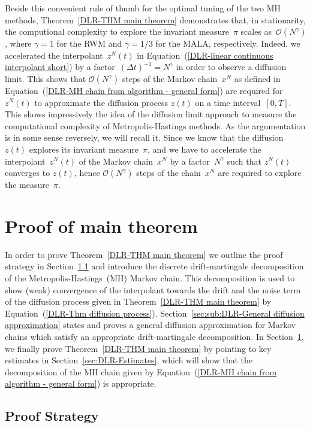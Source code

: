 Beside this convenient rule of thumb for the optimal tuning of the two MH methods, Theorem~\ref{DLR-THM main theorem} demonstrates that, in stationarity, the computional complexity to explore the invariant measure~$\pi$ scales as~$\mathcal{O}(N^{\gamma})$, where $\gamma=1$ for the RWM and $\gamma=1/3$ for the MALA, respectively. Indeed, we accelerated the interpolant~$z^N(t)$ in Equation~(\ref{DLR-linear continuous interpolant short}) by a factor~$(\Delta t)^{-1} = N^{\gamma}$ in order to observe a diffusion limit. This shows that $\mathcal{O}(N^{\gamma})$ steps of the Markov chain~$x^N$ as defined in Equation~(\ref{DLR-MH chain from algorithm - general form}) are required for $z^N(t)$ to approximate the diffusion process $z(t)$ on a time interval~$[0,T]$. This shows impressively the idea of the diffusion limit approach to measure the computational complexity of Metropolis-Hastings methods. As the argumentation is in some sense reversely, we will recall it. Since we know that the diffusion~$z(t)$ explores its invariant measure~$\pi$, and we have to accelerate the interpolant~$z^N(t)$ of the Markov chain~$x^N$ by a factor~$N^{\gamma}$ such that $z^N(t)$ converges to $z(t)$, hence $\mathcal{O}(N^{\gamma})$ steps of the chain~$x^N$ are required to explore the measure~$\pi$.


\section{Proof of main theorem}
\label{sec:DLR-Proof}

In order to prove Theorem~\ref{DLR-THM main theorem} we outline the proof strategy in Section~\ref{sec:sub:DLR-Proof strategy} and introduce the discrete drift-martingale decomposition of the Metropolis-Hastings~(MH) Markov chain. This decomposition is used to show (weak) convergence of the interpolant towards the drift and the noise term of the diffusion process given in Theorem~\ref{DLR-THM main theorem} by Equation~(\ref{DLR-Thm diffusion process}). Section~\ref{sec:sub:DLR-General diffusion approximation} states and proves a general diffusion approximation for Markov chains which satisfy an appropriate drift-martingale decomposition. In Section~\ref{sec:DLR-Proof}, we finally prove Theorem~\ref{DLR-THM main theorem} by pointing to key estimates in Section~\ref{sec:DLR-Estimates}, which will show that the decomposition of the MH chain given by Equation~(\ref{DLR-MH chain from algorithm - general form}) is appropriate.

\subsection{Proof Strategy}
\label{sec:sub:DLR-Proof strategy}

